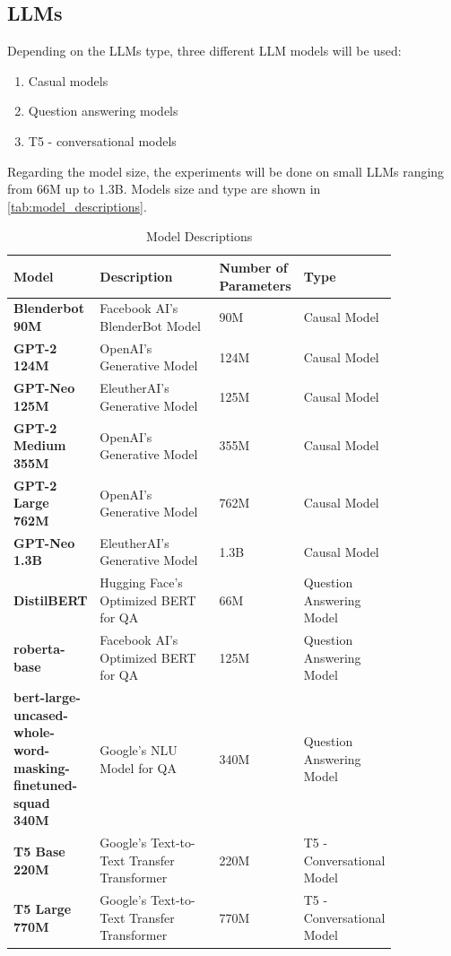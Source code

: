 \documentclass{wseas}
\begin{document}
\subsection{LLMs}

Depending on the LLMs type, three different LLM models will be used:

\begin{enumerate}
\item
  Casual models
\item
  Question answering models
\item
  T5 - conversational models
\end{enumerate}

Regarding the model size, the experiments will be done on small LLMs
ranging from 66M up to 1.3B. Models size and type are shown in \autoref{tab:model_descriptions}.
\begin{table}[htbp]
  \centering
  \caption{Model Descriptions} %
  \label{tab:model_descriptions}  %
  \begin{tabular}{|p{0.2\linewidth}|p{0.35\linewidth}|p{0.15\linewidth}|p{0.15\linewidth}|}
  \hline
  \textbf{Model} & \textbf{Description} & \textbf{Number of Parameters} & \textbf{Type} \\
  \hline
  \textbf{Blenderbot 90M} & Facebook AI's BlenderBot Model & 90M & Causal Model \\
  \hline
  \textbf{GPT-2 124M} & OpenAI's Generative Model & 124M & Causal Model \\
  \hline
  \textbf{GPT-Neo 125M} & EleutherAI's Generative Model & 125M & Causal Model \\
  \hline
  \textbf{GPT-2 Medium 355M} & OpenAI's Generative Model & 355M & Causal Model \\
  \hline
  \textbf{GPT-2 Large 762M} & OpenAI's Generative Model & 762M & Causal Model \\
  \hline
  \textbf{GPT-Neo 1.3B} & EleutherAI's Generative Model & 1.3B & Causal Model \\
  \hline
  \textbf{DistilBERT} & Hugging Face's Optimized BERT for QA & 66M & Question Answering Model \\
  \hline
  \textbf{roberta-base} & Facebook AI's Optimized BERT for QA & 125M & Question Answering Model \\
  \hline
  \textbf{bert-large-uncased-whole-word-masking-finetuned-squad 340M} & Google's NLU Model for QA & 340M & Question Answering Model \\
  \hline
  \textbf{T5 Base 220M} & Google's Text-to-Text Transfer Transformer & 220M & T5 - Conversational Model \\
  \hline
  \textbf{T5 Large 770M} & Google's Text-to-Text Transfer Transformer & 770M & T5 - Conversational Model \\
  \hline
  \end{tabular}
\end{table}  
\end{document}

